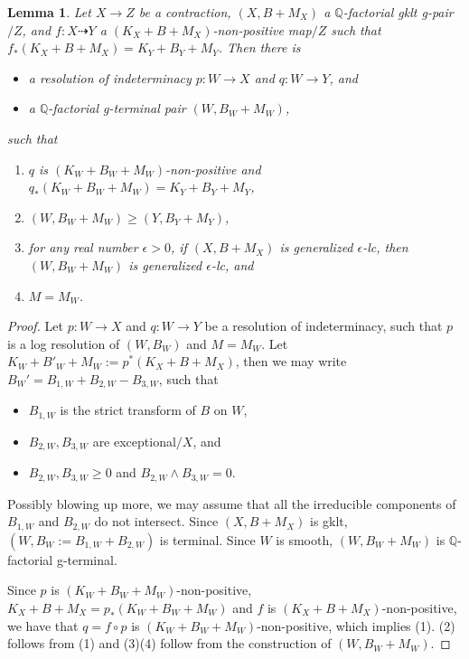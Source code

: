 \documentclass[11pt]{amsart}
\numberwithin{equation}{section}
\newcommand{\Qq}{\mathbb{Q}}
\newtheorem{lem}[thm]{Lemma}
\theoremstyle{definition}
\theoremstyle{remark}
\theoremstyle{definition}
\begin{document}
\begin{lem}\label{lem: terminalization and mmp}
Let $X\rightarrow Z$ be a contraction, $(X,B+M_X)$ a $\Qq$-factorial gklt g-pair$/Z$, and $f: X\dashrightarrow Y$ a $(K_X+B+M_X)$-non-positive map$/Z$ such that $f_*(K_X+B+M_X)=K_Y+B_Y+M_Y$. Then there is 
\begin{itemize}
    \item a resolution of indeterminacy $p: W\rightarrow X$ and $q: W\rightarrow Y$, and
    \item a $\Qq$-factorial g-terminal pair $(W,B_W+M_W)$,
\end{itemize}
such that
\begin{enumerate}
    \item $q$ is $(K_W+B_W+M_W)$-non-positive and $q_*(K_W+B_W+M_W)=K_Y+B_Y+M_Y$,
    \item $(W,B_W+M_W)\geq (Y,B_Y+M_Y)$,
    \item for any real number $\epsilon>0$, if $(X,B+M_X)$ is generalized $\epsilon$-lc, then $(W,B_W+M_W)$ is generalized $\epsilon$-lc, and
    \item $M=M_W$.
\end{enumerate} 
\end{lem}

\begin{proof}
Let $p: W\rightarrow X$ and $q: W\rightarrow Y$ be a resolution of indeterminacy, such that $p$ is a log resolution of $(W,B_W)$ and $M=M_W$. Let $K_W+B'_W+M_W:=p^*(K_X+B+M_X)$, then we may write
$B_W'=B_{1,W}+B_{2,W}-B_{3,W}$,
such that
\begin{itemize}
    \item $B_{1,W}$ is the strict transform of $B$ on $W$, 
    \item $B_{2,W},B_{3,W}$ are exceptional$/X$, and
    \item $B_{2,W},B_{3,W}\geq 0$ and $B_{2,W}\wedge B_{3,W}=0$.
\end{itemize}
Possibly blowing up more, we may assume that all the irreducible components of $B_{1,W}$ and $B_{2,W}$ do not intersect. Since $(X,B+M_X)$ is gklt, $(W,B_W:=B_{1,W}+B_{2,W})$ is terminal. Since $W$ is smooth, $(W,B_W+M_W)$ is $\Qq$-factorial g-terminal. 

Since $p$ is $(K_W+B_W+M_W)$-non-positive, $K_X+B+M_X=p_*(K_W+B_W+M_W)$ and $f$ is $(K_X+B+M_X)$-non-positive, we have that $q=f\circ p$ is $(K_W+B_W+M_W)$-non-positive, which implies (1). (2) follows from (1) and (3)(4) follow from the construction of $(W,B_W+M_W)$.
\end{proof}
\end{document}
